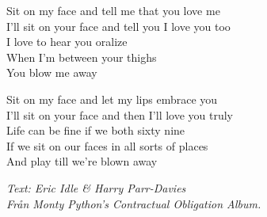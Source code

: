 \vspace{10pt}
Sit on my face and tell me that you love me\\
I'll sit on your face and tell you I love you too\\
I love to hear you oralize\\
When I'm between your thighs\\
You blow me away\par
\vspace{10pt}
Sit on my face and let my lips embrace you\\
I'll sit on your face and then I'll love you truly\\
Life can be fine if we both sixty nine\\
If we sit on our faces in all sorts of places\\
And play till we're blown away
\par
\vspace{10pt}
{\footnotesize\textit{Text: Eric Idle \& Harry Parr-Davies\\
Från Monty Python's Contractual Obligation Album.}}

